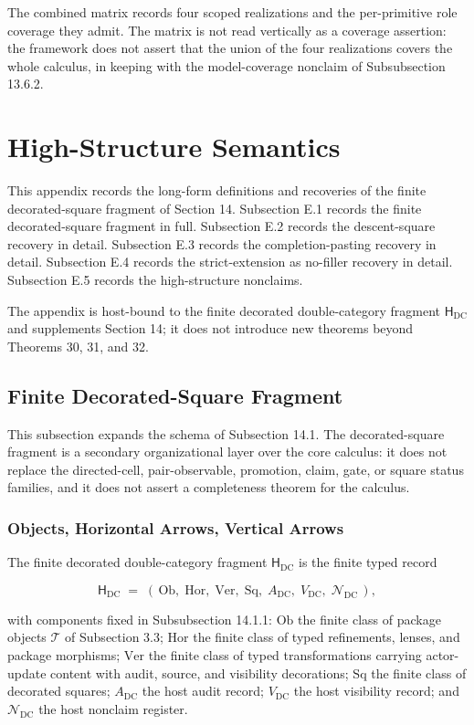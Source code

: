 \documentclass[11pt]{article}
\theoremstyle{definition}
\begin{document}
The combined matrix records four scoped realizations and the per-primitive role coverage they admit. The matrix is not read vertically as a coverage assertion: the framework does not assert that the union of the four realizations covers the whole calculus, in keeping with the model-coverage nonclaim of Subsubsection 13.6.2.
 \section{High-Structure Semantics}

This appendix records the long-form definitions and recoveries of the finite decorated-square fragment of Section 14. Subsection E.1 records the finite decorated-square fragment in full. Subsection E.2 records the descent-square recovery in detail. Subsection E.3 records the completion-pasting recovery in detail. Subsection E.4 records the strict-extension as no-filler recovery in detail. Subsection E.5 records the high-structure nonclaims.

The appendix is host-bound to the finite decorated double-category fragment \(\mathsf H_{\mathrm{DC}}\) and supplements Section 14; it does not introduce new theorems beyond Theorems 30, 31, and 32.

\subsection{Finite Decorated-Square Fragment}

This subsection expands the schema of Subsection 14.1. The decorated-square fragment is a secondary organizational layer over the core calculus: it does not replace the directed-cell, pair-observable, promotion, claim, gate, or square status families, and it does not assert a completeness theorem for the calculus.

\subsubsection{Objects, Horizontal Arrows, Vertical Arrows}

The finite decorated double-category fragment \(\mathsf H_{\mathrm{DC}}\) is the finite typed record

\[
\mathsf H_{\mathrm{DC}}\;=\;(\,\mathrm{Ob},\;\mathrm{Hor},\;\mathrm{Ver},\;\mathrm{Sq},\;A_{\mathrm{DC}},\;V_{\mathrm{DC}},\;\mathcal N_{\mathrm{DC}}\,),
\]

with components fixed in Subsubsection 14.1.1: \(\mathrm{Ob}\) the finite class of package objects \(\mathcal T\) of Subsection 3.3; \(\mathrm{Hor}\) the finite class of typed refinements, lenses, and package morphisms; \(\mathrm{Ver}\) the finite class of typed transformations carrying actor-update content with audit, source, and visibility decorations; \(\mathrm{Sq}\) the finite class of decorated squares; \(A_{\mathrm{DC}}\) the host audit record; \(V_{\mathrm{DC}}\) the host visibility record; and \(\mathcal N_{\mathrm{DC}}\) the host nonclaim register.
\end{document}
